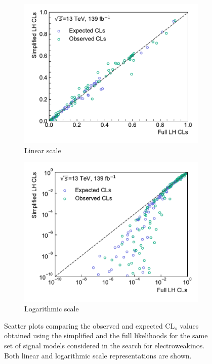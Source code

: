 \begin{figure}
	\centering
	\begin{subfigure}[b]{0.5\textwidth}
		\centering\includegraphics[width=\textwidth]{cls_scatter_1Lbb_lin}
		\caption{Linear scale}
	\end{subfigure}\hfill
	\begin{subfigure}[b]{0.5\textwidth}
		\centering\includegraphics[width=\textwidth]{cls_scatter_1Lbb_log}
		\caption{Logarithmic scale}
	\end{subfigure}
	\caption{Scatter plots comparing the observed and expected CL$_s$ values obtained using the simplified and the full likelihoods for the same set of signal models considered in the search for electroweakinos. Both linear and logarithmic scale representations are shown.}\label{fig:scatter_cls}
\end{figure}


